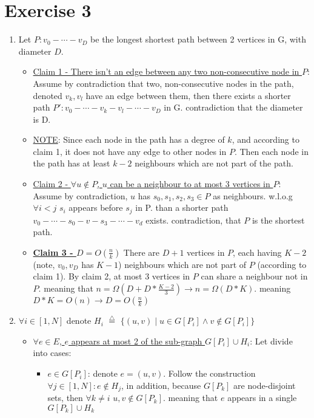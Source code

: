 \documentclass[11pt]{article}
\begin{document}
\section*{Exercise 3}
\begin{enumerate}
    \item 
    Let $P: v_0 - \cdots - v_D$ be the longest shortest path between 2 vertices in G, with diameter $D$.
    \begin{itemize}
        \item \underline{Claim 1 - There isn't an edge between any two non-consecutive node in $P$}:
        \newline
        Assume by contradiction that two, non-consecutive nodes in the path, denoted $v_k, v_l$ have an edge between them, then there exists a shorter path $P': v_0 - \cdots - v_k - v_l -\cdots - v_D$ in G. contradiction that the diameter is D. 
        \item \underline{NOTE}: Since each node in the path has a degree of $k$, and according to claim 1, it does not have any edge to other nodes in $P$. Then each node in the path has at least $k-2$ neighbours which are not part of the path.
        
        \item \underline{Claim 2 - ${ \forall u \notin P}$, $u$ can be a neighbour to at most 3 vertices in $P$}:
        Assume by contradiction, $ u $ has ${s_0, s_1, s_2, s_3 \in P}$ as neighbours. w.l.o.g  ${ \forall i < j}$ ${s_i}$ appears before $ s_j $ in P. than a shorter path $ v_0 - \cdots - s_0 - v - s_3 - \cdots - v_d$ exists. contradiction, that $P$ is the shortest path.
        
        \item\underline{\textbf{Claim 3 - $D =O(\frac{n}{k})$}}
        There are $D+1$ vertices in $P$, each having $K-2$ (note, $v_0, v_D$ has $K-1$) neighbours which are not part of $P$ (according to claim 1). By claim 2, at most 3 vertices in $P$ can share a neighbour not in $P$. meaning that $n = \Omega(D + D*\frac{K-2}{3}) \rightarrow  n = \Omega (D*K)$. meaning $D*K = O(n) \rightarrow D = O(\frac{n}{k})$
        
    \end{itemize}
    
    \item 
    ${\forall i \in [1,N]}$ denote ${H_i}$ $\overset{\triangle}{=}$ $\{(u,v) \mid u \in G[P_i] \land  v \notin G[P_i] \}$
    \begin{itemize}
        \item \underline{$\forall e\in E$, $e$ appears at most 2 of the sub-graph $G[P_i]\cup H_i$}:
        \newline
        Let divide into cases:
        \begin{itemize}
            \item \underline{${e\in G[P_i]}$}:
            denote $e=(u,v)$. Follow the construction $\forall j\in[1,N]: e \notin H_j$, in addition, because $G[P_k]$ are node-disjoint sets, then $ \forall k \neq i$ $u,v \notin G[P_k]$. meaning that $e$ appears in a single $G[P_k] \cup H_k$
            

\end{itemize}
\end{itemize}
\end{enumerate}
\end{document}
